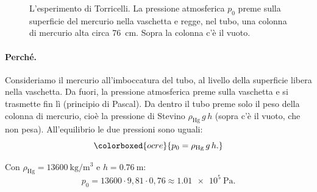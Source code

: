\begin{figure}[!htbp]
    \centering
    \caption{L'esperimento di Torricelli. La pressione atmosferica $p_0$ preme sulla superficie del mercurio nella vaschetta e regge, nel tubo, una colonna di mercurio alta circa \SI{76}{\centi\metre}. Sopra la colonna c'è il vuoto.}
    \label{fig:torricelli}
\end{figure}

\paragraph{Perché.} Consideriamo il mercurio all'imboccatura del tubo, al livello della superficie libera nella vaschetta. Da fuori, la pressione atmosferica preme sulla vaschetta e si trasmette fin lì (principio di Pascal). Da dentro il tubo preme solo il peso della colonna di mercurio, cioè la pressione di Stevino $\rho_\text{Hg}\,g\,h$ (sopra c'è il vuoto, che non pesa). All'equilibrio le due pressioni sono uguali:
\[ \colorboxed{ocre}{ p_0 = \rho_\text{Hg}\,g\,h. } \]

Con $\rho_\text{Hg} = \SI{13600}{\kilo\gram\per\metre\cubed}$ e $h = \SI{0,76}{\metre}$:
\[ p_0 = 13600 \cdot 9{,}81 \cdot 0{,}76 \approx \SI{1,01e5}{\pascal}. \]

